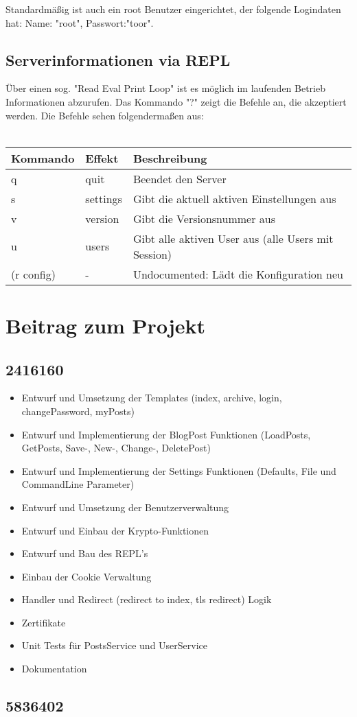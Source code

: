 \documentclass[10pt]{article}
\begin{document}
		Standardm\"a{\ss}ig ist auch ein root Benutzer eingerichtet, der folgende Logindaten hat: Name: "root", Passwort:"toor".
		\subsection{Serverinformationen via REPL}
		\"Uber einen sog. "Read Eval Print Loop" ist es m\"oglich im laufenden Betrieb Informationen abzurufen.
		Das Kommando "?" zeigt die Befehle an, die akzeptiert werden. Die Befehle sehen folgenderma{\ss}en aus:\\\\
		\begin{tabular}{l|l|l}
			Kommando   & Effekt   & Beschreibung\\
			\hline
			q          & quit     & Beendet den Server\\
			s          & settings & Gibt die aktuell aktiven Einstellungen aus\\
			v          & version  & Gibt die Versionsnummer aus\\
			u          & users    & Gibt alle aktiven User aus (alle Users mit Session)\\
			(r config) & -        & Undocumented: L\"adt die Konfiguration neu
		\end{tabular}
	\section{Beitrag zum Projekt}
		\subsection{2416160}
		\begin{itemize}
			\item Entwurf und Umsetzung der Templates (index, archive, login, changePassword, myPosts)
			\item Entwurf und Implementierung der BlogPost Funktionen (LoadPosts, GetPosts, Save-, New-, Change-, DeletePost)
			\item Entwurf und Implementierung der Settings Funktionen (Defaults, File und CommandLine Parameter)
			\item Entwurf und Umsetzung der Benutzerverwaltung
			\item Entwurf und Einbau der Krypto-Funktionen
			\item Entwurf und Bau des REPL's
			\item Einbau der Cookie Verwaltung
			\item Handler und Redirect (redirect to index, tls redirect) Logik
			\item Zertifikate
			\item Unit Tests f\"ur PostsService und UserService
			\item Dokumentation
		\end{itemize}		
		\subsection{5836402}
\end{document}
